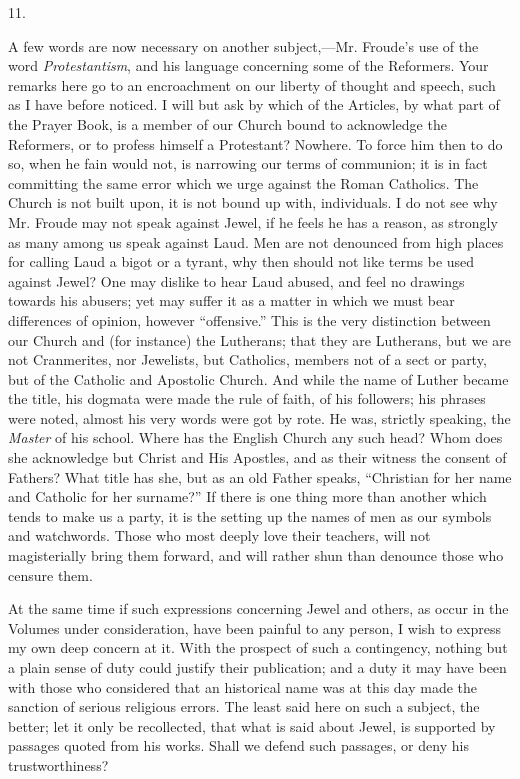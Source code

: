 11.

A few words are now necessary on another
subject,—Mr. Froude's use of the word \emph{Protestantism}, and
his language concerning some of the Reformers. Your remarks here go to
an encroachment on our liberty of thought and speech, such as I have
before noticed. I will but ask by which of the Articles, by what part
of the Prayer Book, is a member of our Church bound to acknowledge the
Reformers, or to profess himself a Protestant? Nowhere. To force him
then to do so, when he fain would not, is narrowing our terms of
communion; it is in fact committing the same error which we urge
against the Roman Catholics. The Church is not built upon, it is not
bound up with, individuals. I do not see why Mr. Froude may not speak
against Jewel, if he feels he has a reason, as strongly as many among
us speak against Laud. Men are not denounced from high places for
calling Laud a bigot or a tyrant, why then should not like terms be
used against Jewel? One may dislike to hear Laud abused, and feel no
drawings towards his abusers; yet may suffer it as a matter in which
we must bear differences of opinion, however ``offensive.'' This is
the very distinction between our Church and (for instance) the
Lutherans; that they are Lutherans, but we are not Cranmerites, nor
Jewelists, but Catholics, members not of a sect or party, but of the
Catholic and Apostolic Church. And while the name of Luther became the
title, his dogmata were made the rule of faith, of his followers; his
phrases were noted, almost his very words were got by rote. He was,
strictly speaking, the \emph{Master} of his school. Where has the
English Church any such head? Whom does she acknowledge but Christ and
His Apostles, and as their witness the consent of Fathers? What title
has she, but as an old Father speaks, ``Christian for her name and
Catholic for her surname?'' If there is one thing more than another
which tends to make us a party, it is the setting up the names of men
as our symbols and watchwords. Those who most deeply love their
teachers, will not magisterially bring them forward, and will rather
shun than denounce those who censure them.

At the same time if such expressions concerning
Jewel and others, as occur in the Volumes under consideration, have
been painful to any person, I wish to express my own deep concern at
it. With the prospect of such a contingency, nothing but a plain sense
of duty could justify their publication; and a duty it may have been
with those who considered that an historical name was at this day made
the sanction of serious religious errors. The least said here on
such a subject, the better; let it only be recollected, that what is
said about Jewel, is supported by passages quoted from his works.
Shall we defend such passages, or deny his trustworthiness?

